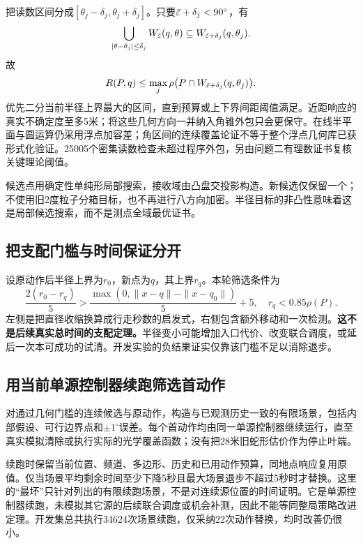 \documentclass[UTF8,a4paper,zihao=-4,fontset=mac]{ctexart}
\begin{document}
把读数区间分成$[\theta_j-\delta_j,\theta_j+\delta_j]$。只要$\bar\varepsilon+\delta_j<90^\circ$，有
\begin{equation}
\bigcup_{|\theta-\theta_j|\le\delta_j}W_{\bar\varepsilon}(q,\theta)
\subseteq W_{\bar\varepsilon+\delta_j}(q,\theta_j).
\end{equation}
故
\begin{equation}\label{eq:radiusbound}
R(P,q)\le \max_j\rho\big(P\cap W_{\bar\varepsilon+\delta_j}(q,\theta_j)\big).
\end{equation}
优先二分当前半径上界最大的区间，直到预算或上下界间距阈值满足。近距响应的真实不确定度至多5米；将这些几何方向一并纳入角锥外包只会更保守。在线半平面与圆运算仍采用浮点加容差；角区间的连续覆盖论证不等于整个浮点几何库已获形式化验证。25005个密集读数检查未超过程序外包，另由问题二有理数证书复核关键理论阈值。

候选点用确定性单纯形局部搜索，接收域由凸盘交投影构造。新候选仅保留一个；不使用旧2度粒子分箱目标，也不再进行八方向加密。半径目标的非凸性意味着这是局部候选搜索，而不是测点全域最优证书。

\subsection{把支配门槛与时间保证分开}
设原动作后半径上界为$r_0$，新点为$q$，其上界$r_q$。本轮筛选条件为
\begin{equation}\frac{2(r_0-r_q)}5 > \frac{\max(0,\|x-q\|-\|x-q_0\|)}5+5,\quad r_q<0.85\rho(P).
\end{equation}
左侧是把直径收缩换算成行走秒数的启发式，右侧包含额外移动和一次检测。\textbf{这不是后续真实总时间的支配定理。}半径变小可能增加入口代价、改变联合调度，或延后一次本可成功的试清。开发实验的负结果证实仅靠该门槛不足以消除退步。

\subsection{用当前单源控制器续跑筛选首动作}
对通过几何门槛的连续候选与原动作，构造与已观测历史一致的有限场景，包括内部假设、可行边界点和$\pm1^\circ$误差。每个首动作均由同一单源控制器继续运行，直至真实模拟清除或执行实际的光学覆盖函数；没有把28米旧蛇形估价作为停止叶端。

续跑时保留当前位置、频道、多边形、历史和已用动作预算，同地点响应复用原值。仅当场景平均剩余时间至少下降5秒且最大场景退步不超过5秒时才替换。这里的“最坏”只针对列出的有限续跑场景，不是对连续源位置的时间证明。它是单源控制器续跑，未模拟其它源的后续联合调度或机会补测，因此不能等同整局策略改进定理。开发集总共执行34624次场景续跑，仅采纳22次动作替换，均时改善仍很小。
\end{document}

